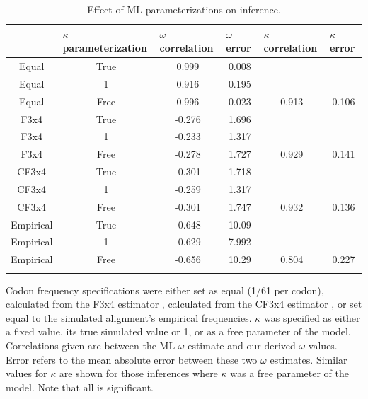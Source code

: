 \documentclass[11pt]{article}
\begin{document}
	

\begin{table}[htbp]
\caption {\label{tab:mlspec}Effect of ML parameterizations on inference.}
\begin{tabular}{c c c c c c}
\hline\noalign{\smallskip}
\multicolumn{1}{l}{Codon frequencies} & \multicolumn{1}{l}{$\kappa$ parameterization} & \multicolumn{1}{l}{$\omega$ correlation} &\multicolumn{1}{l}{$\omega$ error} & \multicolumn{1}{l}{$\kappa$ correlation} &\multicolumn{1}{l}{$\kappa$ error} \\
\hline\noalign{\smallskip}
Equal & True & 0.999 & 0.008 &   &   \\ %
Equal & 1 & 0.916 & 0.195 &   &   \\ 
Equal & Free & 0.996 & 0.023 & 0.913 & 0.106 \\ 
\hline\noalign{\smallskip}
F3x4 & True & -0.276 & 1.696 &   &   \\ 
F3x4 & 1 & -0.233 & 1.317 &   &   \\ 
F3x4 & Free & -0.278 & 1.727 & 0.929 & 0.141 \\ 
\hline\noalign{\smallskip}
CF3x4 & True & -0.301 & 1.718 &   &   \\ 
CF3x4 & 1 & -0.259 & 1.317 &   &   \\ 
CF3x4 & Free & -0.301 & 1.747 & 0.932 & 0.136 \\ 
\hline\noalign{\smallskip}
Empirical & True & -0.648 & 10.09 &   &   \\ 
Empirical & 1 & -0.629 & 7.992 &   &   \\ 
Empirical & Free & -0.656 & 10.29 & 0.804 & 0.227 \\ 
\noalign{\smallskip}\hline\noalign{\smallskip}
\end{tabular}
\newline
Codon frequency specifications were either set as equal (1/61 per codon), calculated from the F3x4 estimator \cite{MuseGaut1994}, calculated from the CF3x4 estimator \cite{Pond2010}, or set equal to the simulated alignment's empirical frequencies. $\kappa$ was specified as either a fixed value, its true simulated value or 1, or as a free parameter of the model. Correlations given are between the ML $\omega$ estimate and our derived $\omega$ values. Error refers to the mean absolute error between these two $\omega$ estimates. Similar values for $\kappa$ are shown for those inferences where $\kappa$ was a free parameter of the model. Note that all is significant.
\end{table}	
	
\end{document}

